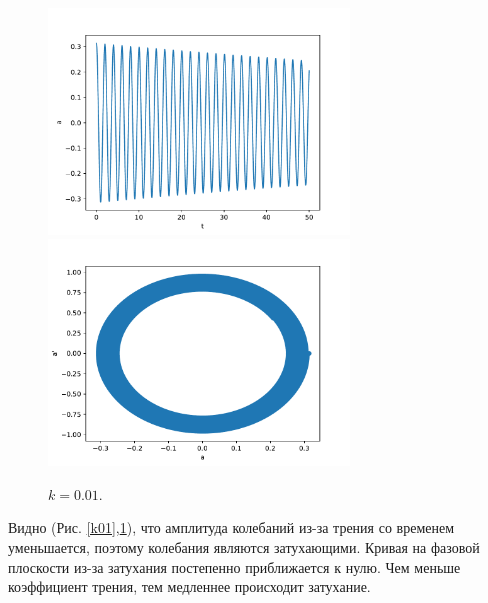             \begin{figure}[H]
                \centering
                \includegraphics[width=8cm]{pictures/3resonance2.pdf}
                \includegraphics[width=8cm]{pictures/3resonance2p.pdf}
                \caption{$k = 0.01$.} \label{k001}
            \end{figure}

            Видно (Рис. \ref{k01},\ref{k001}), что амплитуда колебаний из-за трения со временем уменьшается, поэтому колебания являются затухающими. Кривая на фазовой плоскости из-за затухания постепенно приближается к нулю. Чем меньше коэффициент трения, тем медленнее происходит затухание.

